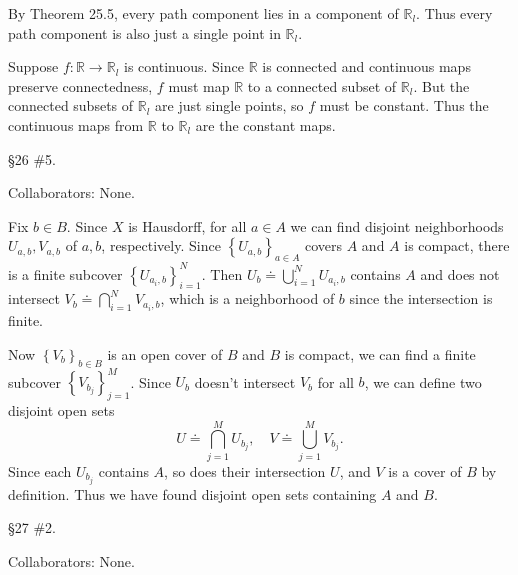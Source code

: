\documentclass[10pt]{report}
\begin{document}
By Theorem 25.5, every path component lies in a component of $\mathbb{R}_l$. Thus every path component is also just a single point in $\mathbb{R}_l$.

Suppose $f:\mathbb{R}\to \mathbb{R}_l$ is continuous. Since $\mathbb{R}$ is connected and continuous maps preserve connectedness, $f$ must map $\mathbb{R}$ to a connected subset of $\mathbb{R}_l$. But the connected subsets of $\mathbb{R}_l$ are just single points, so $f$ must be constant. Thus the continuous maps from $\mathbb{R}$ to $\mathbb{R}_l$ are the constant maps.

\pagebreak

\begin{exer}[]
\S 26 \#5.
\end{exer}
{\color{blue}Collaborators: None.}

Fix $b \in B$. Since $X$ is Hausdorff, for all $a \in A$ we can find disjoint neighborhoods $U_{a,b}, V_{a,b}$ of $a,b$, respectively. Since $\left\{ U_{a,b} \right\}_{a \in A}$ covers $A$ and $A$ is compact, there is a finite subcover $\left\{ U_{a_i,b} \right\}_{i=1}^N$. Then $U_{b}\doteq \bigcup_{i=1}^N U_{a_i,b}$ contains $A$ and does not intersect $V_{b}\doteq \bigcap_{i=1}^N V_{a_i,b}$, which is a neighborhood of $b$ since the intersection is finite.

        Now $\left\{ V_{b} \right\}_{b \in B}$ is an open cover of $B$ and $B$ is compact, we can find a finite subcover $\left\{ V_{b_j} \right\}_{j=1}^M$. Since $U_b$ doesn't intersect $V_b$ for all $b$, we can define two disjoint open sets
        \[
                U \doteq \bigcap_{j=1}^M U_{b_j}, \quad V \doteq \bigcup_{j=1}^M V_{b_j}.
        \]
        Since each $U_{b_j}$ contains $A$, so does their intersection $U$, and $V$ is a cover of $B$ by definition. Thus we have found disjoint open sets containing $A$ and $B$.

\begin{exer}[]
\S 27 \#2.
\end{exer}
{\color{blue}Collaborators: None.}
\end{document}
